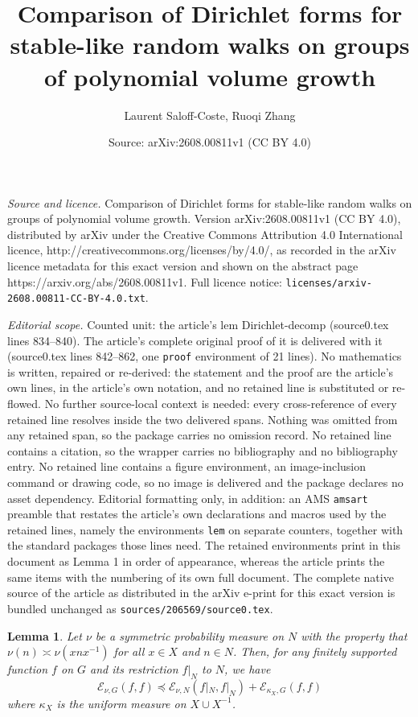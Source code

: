 \documentclass[10pt,a4paper]{amsart}
\title{Comparison of Dirichlet forms for stable-like random walks on groups of polynomial volume growth}
\author{Laurent Saloff-Coste, Ruoqi Zhang}
\date{Source: arXiv:2608.00811v1 (CC BY 4.0)}
\newtheorem{lem}{Lemma}
\begin{document}
\maketitle

\noindent\emph{Source and licence.} Comparison of Dirichlet forms for stable-like random walks on groups of polynomial volume growth. Version arXiv:2608.00811v1 (CC BY 4.0), distributed by arXiv under the Creative Commons Attribution 4.0 International licence, http://creativecommons.org/licenses/by/4.0/, as recorded in the arXiv licence metadata for this exact version and shown on the abstract page https://arxiv.org/abs/2608.00811v1. Full licence notice: \texttt{licenses/arxiv-2608.00811-CC-BY-4.0.txt}.\par\smallskip

\noindent\textit{Editorial scope.} Counted unit: the article's lem Dirichlet-decomp (source0.tex lines 834--840). The article's complete original proof of it is delivered with it (source0.tex lines 842--862, one \texttt{proof} environment of 21 lines). No mathematics is written, repaired or re-derived: the statement and the proof are the article's own lines, in the article's own notation, and no retained line is substituted or re-flowed.  No further source-local context is needed: every cross-reference of every retained line resolves inside the two delivered spans.  Nothing was omitted from any retained span, so the package carries no omission record.  No retained line contains a citation, so the wrapper carries no bibliography and no bibliography entry.  No retained line contains a figure environment, an image-inclusion command or drawing code, so no image is delivered and the package declares no asset dependency.  Editorial formatting only, in addition: an AMS \texttt{amsart} preamble that restates the article's own declarations and macros used by the retained lines, namely the environments \texttt{lem} on separate counters, together with the standard packages those lines need.  The retained environments print in this document as Lemma 1 in order of appearance, whereas the article prints the same items with the numbering of its own full document.  The complete native source of the article as distributed in the arXiv e-print for this exact version is bundled unchanged as \texttt{sources/206569/source0.tex}.
\begin{lem}
\label{lem: Dirichlet-decomp} 
Let  $\nu$ be a symmetric probability measure on $N$ with the property that $\nu(n) \asymp \nu(xnx^{-1})$ for all $x\in X$ and $n\in N$.  
Then, for any finitely supported function $f$ on $G$ and its restriction $\left. f\right|_N$ to $N$, we have  
$$\mathcal{E}_{\nu, G}(f,f)\preccurlyeq  \mathcal{E}_{\nu, N}(f|_N,f|_N) + \mathcal{E}_{\kappa_X, G}(f,f)$$
where $\kappa_X$ is the uniform measure on $X\cup X^{-1}$. 
\end{lem}
\end{document}
